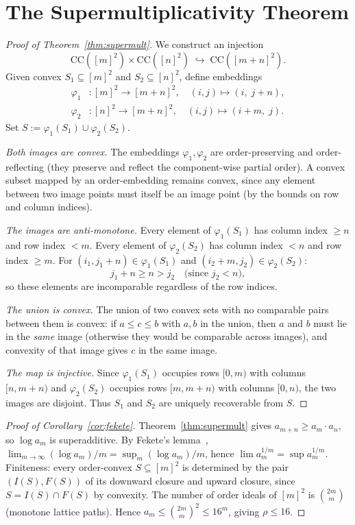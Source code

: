 \documentclass[11pt,a4paper]{article}
\theoremstyle{plain}
\theoremstyle{definition}
\theoremstyle{remark}
\newcommand{\CC}{\mathrm{CC}}
\begin{document}
\section{The Supermultiplicativity Theorem}\label{sec:supermult}

\begin{proof}[Proof of Theorem~\ref{thm:supermult}]
We construct an injection
\[
\CC([m]^2) \times \CC([n]^2) \;\hookrightarrow\; \CC([m+n]^2).
\]
Given convex $S_1 \subseteq [m]^2$ and $S_2 \subseteq [n]^2$, define embeddings
\begin{align*}
\varphi_1 &: [m]^2 \to [m+n]^2, \quad (i, j) \mapsto (i,\; j + n), \\
\varphi_2 &: [n]^2 \to [m+n]^2, \quad (i, j) \mapsto (i + m,\; j).
\end{align*}
Set $S := \varphi_1(S_1) \cup \varphi_2(S_2)$.

\textit{Both images are convex.}
The embeddings $\varphi_1, \varphi_2$ are order-preserving and order-reflecting (they preserve and reflect the component-wise partial order).
A convex subset mapped by an order-embedding remains convex, since any element between two image points must itself be an image point (by the bounds on row and column indices).

\textit{The images are anti-monotone.}
Every element of $\varphi_1(S_1)$ has column index $\geq n$ and row index $< m$.
Every element of $\varphi_2(S_2)$ has column index $< n$ and row index $\geq m$.
For $(i_1, j_1 + n) \in \varphi_1(S_1)$ and $(i_2 + m, j_2) \in \varphi_2(S_2)$:
\[
j_1 + n \geq n > j_2 \quad\text{(since } j_2 < n\text{)},
\]
so these elements are incomparable regardless of the row indices.

\textit{The union is convex.}
The union of two convex sets with no comparable pairs between them is convex: if $a \leq c \leq b$ with $a, b$ in the union, then $a$ and $b$ must lie in the \emph{same} image (otherwise they would be comparable across images), and convexity of that image gives $c$ in the same image.

\textit{The map is injective.}
Since $\varphi_1(S_1)$ occupies rows $[0, m)$ with columns $[n, m+n)$ and $\varphi_2(S_2)$ occupies rows $[m, m+n)$ with columns $[0, n)$, the two images are disjoint.
Thus $S_1$ and $S_2$ are uniquely recoverable from $S$.
\end{proof}

\begin{proof}[Proof of Corollary~\ref{cor:fekete}]
Theorem~\ref{thm:supermult} gives $a_{m+n} \geq a_m \cdot a_n$, so $\log a_m$ is superadditive.
By Fekete's lemma~\cite{fekete1923}, $\lim_{m \to \infty} (\log a_m) / m = \sup_m (\log a_m) / m$, hence $\lim a_m^{1/m} = \sup a_m^{1/m}$.
Finiteness: every order-convex $S \subseteq [m]^2$ is determined by the pair $(I(S), F(S))$ of its downward closure and upward closure, since $S = I(S) \cap F(S)$ by convexity.
The number of order ideals of $[m]^2$ is $\binom{2m}{m}$ (monotone lattice paths).
Hence $a_m \leq \binom{2m}{m}^2 \leq 16^m$, giving $\rho \leq 16$.
\end{proof}
\end{document}
